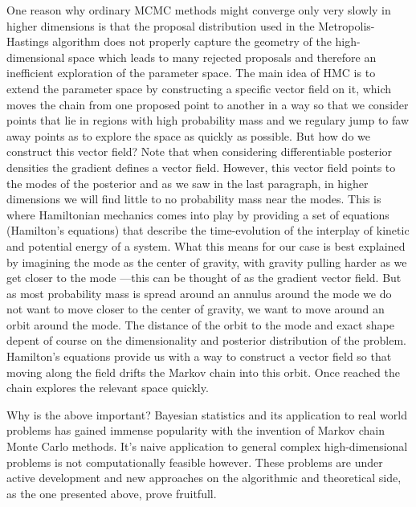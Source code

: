 One reason why ordinary MCMC methods might converge only very slowly in higher dimensions is that the proposal distribution used in the Metropolis-Hastings algorithm does not properly capture the geometry of the high-dimensional space which leads to many rejected proposals and therefore an inefficient exploration of the parameter space.
The main idea of HMC is to extend the parameter space by constructing a specific vector field on it, which moves the chain from one proposed point to another in a way so that we consider points that lie in regions with high probability mass and we regulary jump to faw away points as to explore the space as quickly as possible.
But how do we construct this vector field?
Note that when considering differentiable posterior densities the gradient defines a vector field.
However, this vector field points to the modes of the posterior and as we saw in the last paragraph, in higher dimensions we will find little to no probability mass near the modes.
This is where Hamiltonian mechanics comes into play by providing a set of equations (Hamilton's equations) that describe the time-evolution of the interplay of kinetic and potential energy of a system.
What this means for our case is best explained by imagining the mode as the center of gravity, with gravity pulling harder as we get closer to the mode ---this can be thought of as the gradient vector field.
But as most probability mass is spread around an annulus around the mode we do not want to move closer to the center of gravity, we want to move around an orbit around the mode.
The distance of the orbit to the mode and exact shape depent of course on the dimensionality and posterior distribution of the problem.
Hamilton's equations provide us with a way to construct a vector field so that moving along the field drifts the Markov chain into this orbit.
Once reached the chain explores the relevant space quickly.

Why is the above important?
Bayesian statistics and its application to real world problems has gained immense popularity with the invention of Markov chain Monte Carlo methods.
It's naive application to general complex high-dimensional problems is not computationally feasible however.
These problems are under active development and new approaches on the algorithmic and theoretical side, as the one presented above, prove fruitfull.
